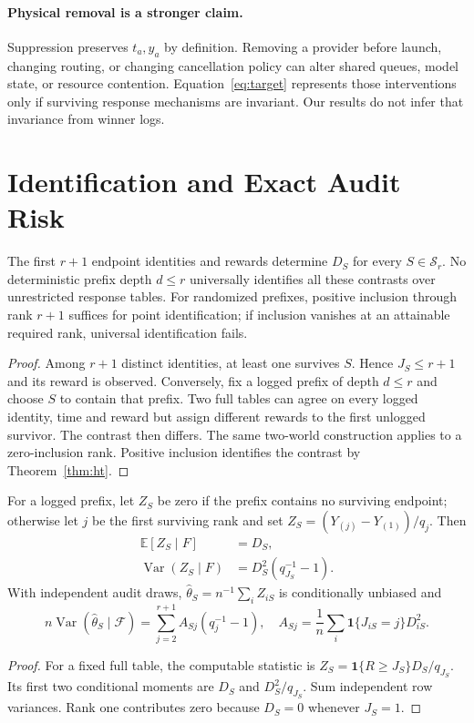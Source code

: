 \documentclass[12pt]{clear2027}
\newcommand{\E}{\mathbb{E}}
\newcommand{\Var}{\operatorname{Var}}
\newcommand{\ind}{\mathbf{1}}
\newcommand{\calS}{\mathcal{S}}
\begin{document}
\paragraph{Physical removal is a stronger claim.}
Suppression preserves $t_a,y_a$ by definition. Removing a provider before launch, changing routing, or changing cancellation policy can alter shared queues, model state, or resource contention. Equation~\eqref{eq:target} represents those interventions only if surviving response mechanisms are invariant. Our results do not infer that invariance from winner logs.

\section{Identification and Exact Audit Risk}
\begin{theorem}\label{thm:depth}
The first $r+1$ endpoint identities and rewards determine $D_S$ for every $S\in\calS_r$. No deterministic prefix depth $d\le r$ universally identifies all these contrasts over unrestricted response tables. For randomized prefixes, positive inclusion through rank $r+1$ suffices for point identification; if inclusion vanishes at an attainable required rank, universal identification fails.
\end{theorem}
\begin{proof}
Among $r+1$ distinct identities, at least one survives $S$. Hence $J_S\le r+1$ and its reward is observed. Conversely, fix a logged prefix of depth $d\le r$ and choose $S$ to contain that prefix. Two full tables can agree on every logged identity, time and reward but assign different rewards to the first unlogged survivor. The contrast then differs. The same two-world construction applies to a zero-inclusion rank. Positive inclusion identifies the contrast by Theorem~\ref{thm:ht}.
\end{proof}

\begin{theorem}\label{thm:ht}
For a logged prefix, let $Z_S$ be zero if the prefix contains no surviving endpoint; otherwise let $j$ be the first surviving rank and set $Z_S=(Y_{(j)}-Y_{(1)})/q_j$. Then
\begin{align}
 \E[Z_S\mid F]&=D_S,\label{eq:ht}\\
 \Var(Z_S\mid F)&=D_S^2(q_{J_S}^{-1}-1).\label{eq:var}
\end{align}
With independent audit draws, $\widehat\theta_S=n^{-1}\sum_i Z_{iS}$ is conditionally unbiased and
\begin{equation}
 n\Var(\widehat\theta_S\mid\mathcal F)
 =\sum_{j=2}^{r+1}A_{Sj}(q_j^{-1}-1),\quad
 A_{Sj}=\frac1n\sum_i\ind\{J_{iS}=j\}D_{iS}^2.\label{eq:A}
\end{equation}
\end{theorem}
\begin{proof}
For a fixed full table, the computable statistic is $Z_S=\ind\{R\ge J_S\}D_S/q_{J_S}$. Its first two conditional moments are $D_S$ and $D_S^2/q_{J_S}$. Sum independent row variances. Rank one contributes zero because $D_S=0$ whenever $J_S=1$.
\end{proof}
\end{document}
